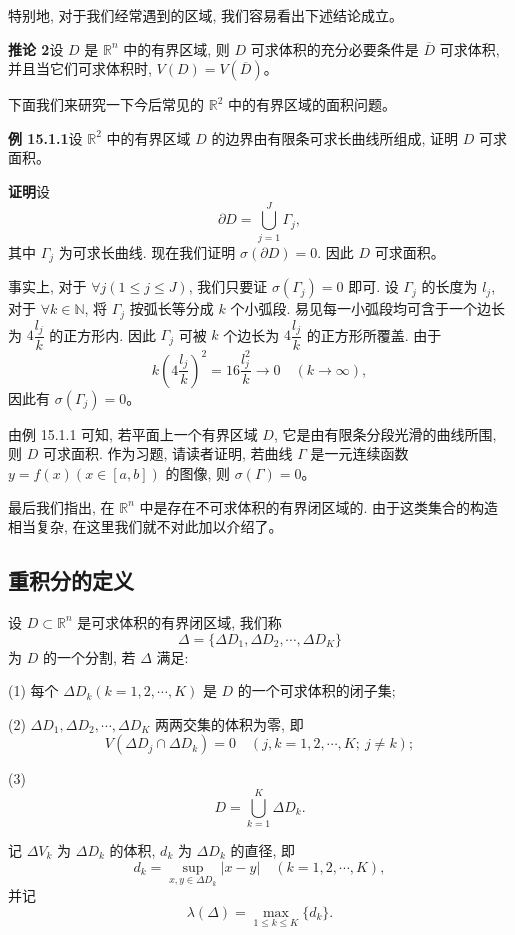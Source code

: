 \documentclass[UTF8, 12pt, fontset=fandol, oneside]{ctexart}
\begin{document}
特别地, 对于我们经常遇到的区域, 我们容易看出下述结论成立。

\noindent\textbf{推论 2}\quad 设 $D$ 是 $\mathbb R^n$ 中的有界区域, 则 $D$ 可求体积的充分必要条件是 $\overline D$ 可求体积, 并且当它们可求体积时, $V(D)=V(\overline D)$。

下面我们来研究一下今后常见的 $\mathbb R^2$ 中的有界区域的面积问题。

\noindent\textbf{例 15.1.1}\quad 设 $\mathbb R^2$ 中的有界区域 $D$ 的边界由有限条可求长曲线所组成, 证明 $D$ 可求面积。

\noindent\textbf{证明}\quad 设
\[
  \partial D=\bigcup_{j=1}^J\Gamma_j,
\]
其中 $\Gamma_j$ 为可求长曲线. 现在我们证明 $\sigma(\partial D)=0$. 因此 $D$ 可求面积。

事实上, 对于 $\forall j(1\leqslant j\leqslant J)$, 我们只要证 $\sigma(\Gamma_j)=0$ 即可. 设 $\Gamma_j$ 的长度为 $l_j$, 对于 $\forall k\in\mathbb N$, 将 $\Gamma_j$ 按弧长等分成 $k$ 个小弧段. 易见每一小弧段均可含于一个边长为 $4\dfrac{l_j}{k}$ 的正方形内. 因此 $\Gamma_j$ 可被 $k$ 个边长为 $4\dfrac{l_j}{k}$ 的正方形所覆盖. 由于
\[
  k\left(4\frac{l_j}{k}\right)^2=16\frac{l_j^2}{k}\to0\quad (k\to\infty),
\]
因此有 $\sigma(\Gamma_j)=0$。

由例 15.1.1 可知, 若平面上一个有界区域 $D$, 它是由有限条分段光滑的曲线所围, 则 $D$ 可求面积. 作为习题, 请读者证明, 若曲线 $\Gamma$ 是一元连续函数 $y=f(x)(x\in[a,b])$ 的图像, 则 $\sigma(\Gamma)=0$。

最后我们指出, 在 $\mathbb R^n$ 中是存在不可求体积的有界闭区域的. 由于这类集合的构造相当复杂, 在这里我们就不对此加以介绍了。

\subsection{重积分的定义}

设 $D\subset\mathbb R^n$ 是可求体积的有界闭区域, 我们称
\[
  \Delta=\{\Delta D_1,\Delta D_2,\cdots,\Delta D_K\}
\]
为 $D$ 的一个分割, 若 $\Delta$ 满足:

(1) 每个 $\Delta D_k(k=1,2,\cdots,K)$ 是 $D$ 的一个可求体积的闭子集;

(2) $\Delta D_1,\Delta D_2,\cdots,\Delta D_K$ 两两交集的体积为零, 即
\[
  V(\Delta D_j\cap\Delta D_k)=0\quad (j,k=1,2,\cdots,K;\ j\ne k);
\]

(3)
\[
  D=\bigcup_{k=1}^K\Delta D_k.
\]

记 $\Delta V_k$ 为 $\Delta D_k$ 的体积, $d_k$ 为 $\Delta D_k$ 的直径, 即
\[
  d_k=\sup_{x,y\in\Delta D_k}|x-y|\quad (k=1,2,\cdots,K),
\]
并记
\[
  \lambda(\Delta)=\max_{1\leqslant k\leqslant K}\{d_k\}.
\]
\end{document}
